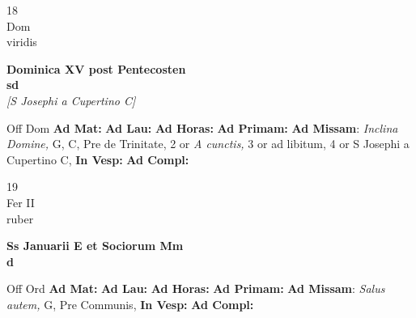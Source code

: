 \documentclass[10pt, openany]{book}
\begin{document}
        \begin{center}
            \begin{minipage}{3.5in}
                \vspace{2em}
                \begin{minipage}{0.5in}
                    {\Huge 18} \\
                    {\normalsize Dom} \\
                    {\normalsize viridis}
                \end{minipage}
                \begin{minipage}{3.0in}
                    \textbf{ \large Dominica XV post Pentecosten \\
                    \textnormal{\normalsize sd}} \\ \textit{[S Josephi a Cupertino C]} \\ 
                \end{minipage}
                \begin{justify}Off Dom
                    \textbf{Ad Mat: }
                    \textbf{Ad Lau: }
                    \textbf{Ad Horas: }
                    \textbf{Ad Primam: }\textbf{Ad Missam}: \textit{Inclina Domine,} G, C, Pre de Trinitate, 2 or \textit{A cunctis,} 3 or ad libitum, 4 or S Josephi a Cupertino C,  
                    \textbf{In Vesp: }
                    \textbf{Ad Compl: }
                \end{justify}
            \end{minipage}
        \end{center}
    
        \begin{center}
            \begin{minipage}{3.5in}
                \vspace{2em}
                \begin{minipage}{0.5in}
                    {\Huge 19} \\
                    {\normalsize Fer II} \\
                    {\normalsize ruber}
                \end{minipage}
                \begin{minipage}{3.0in}
                    \textbf{ \large Ss Januarii E et Sociorum Mm \\
                    \textnormal{\normalsize d}} \\ 
                \end{minipage}
                \begin{justify}Off Ord
                    \textbf{Ad Mat: }
                    \textbf{Ad Lau: }
                    \textbf{Ad Horas: }
                    \textbf{Ad Primam: }\textbf{Ad Missam}: \textit{Salus autem,} G, Pre Communis,  
                    \textbf{In Vesp: }
                    \textbf{Ad Compl: }
                \end{justify}
            \end{minipage}
        \end{center}
    
\end{document}
